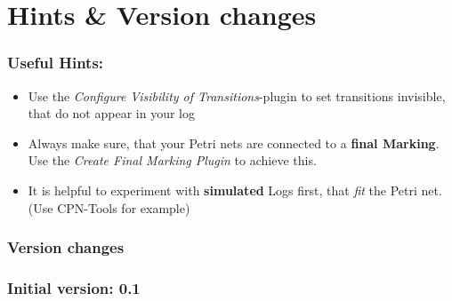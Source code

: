 \section*{Hints \& Version changes}

\subsubsection{Useful Hints:}
\begin{itemize}
  \item Use the \emph{Configure Visibility of Transitions}-plugin to set transitions invisible, that do not appear in your log
  \item Always make sure, that your Petri nets are connected to a \textbf{final Marking}. Use the \emph{Create Final Marking Plugin} to achieve this.
  \item It is helpful to experiment with \textbf{simulated} Logs first, that \emph{fit} the Petri net. (Use CPN-Tools for example)
\end{itemize}

\subsubsection{Version changes}

\subsubsection{Initial version: 0.1}
